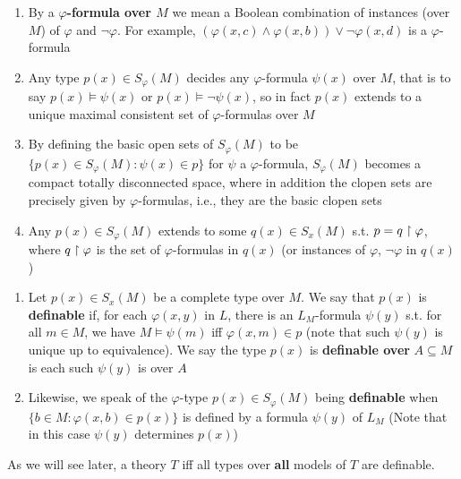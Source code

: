 \documentclass[11pt]{article}
\begin{document}
\begin{remark}
\begin{enumerate}
\item By a \textbf{\(\varphi\)-formula over \(M\)} we mean a Boolean combination of instances (over \(M\)) of
\(\varphi\) and \(\neg\varphi\). For example, \((\varphi(x,c)\wedge\varphi(x,b))\vee\neg\varphi(x,d)\) is a \(\varphi\)-formula
\item Any type \(p(x)\in S_\varphi(M)\) decides any \(\varphi\)-formula \(\psi(x)\) over \(M\), that is to
say \(p(x)\vDash\psi(x)\) or \(p(x)\vDash\neg\psi(x)\), so in fact \(p(x)\) extends to a unique maximal
consistent set of \(\varphi\)-formulas over \(M\)
\item By defining the basic open sets of \(S_\varphi(M)\) to be \(\{p(x)\in S_\varphi(M):\psi(x)\in p\}\) for \(\psi\) a
\(\varphi\)-formula, \(S_\varphi(M)\) becomes a compact totally disconnected space, where in addition the
clopen sets are precisely given by \(\varphi\)-formulas, i.e., they are the basic clopen sets
\item Any \(p(x)\in S_\varphi(M)\) extends to some \(q(x)\in S_x(M)\) s.t. \(p=q\upharpoonright\varphi\), where \(q\upharpoonright\varphi\) is
the set of \(\varphi\)-formulas in \(q(x)\) (or instances of \(\varphi\), \(\neg\varphi\) in \(q(x)\))
\end{enumerate}
\end{remark}

\begin{definition}[]
\begin{enumerate}
\item Let \(p(x)\in S_x(M)\) be a complete type over \(M\). We say that \(p(x)\) is \textbf{definable} if, for
each \(\varphi(x,y)\) in \(L\), there is an \(L_M\)-formula \(\psi(y)\) s.t. for all \(m\in M\), we
have \(M\vDash\psi(m)\) iff \(\varphi(x,m)\in p\) (note that such \(\psi(y)\) is unique up to equivalence). We
say the type \(p(x)\) is \textbf{definable over} \(A\subseteq M\) is each such \(\psi(y)\) is over \(A\)
\item Likewise, we speak of the \(\varphi\)-type \(p(x)\in S_\varphi(M)\) being \textbf{definable}
when \(\{b\in M:\varphi(x,b)\in p(x)\}\) is defined by a formula \(\psi(y)\) of \(L_M\) (Note that in this
case \(\psi(y)\) determines \(p(x)\))
\end{enumerate}
\end{definition}

As we will see later, a theory \(T\) iff all types over \textbf{all} models of \(T\) are definable.
\end{document}

